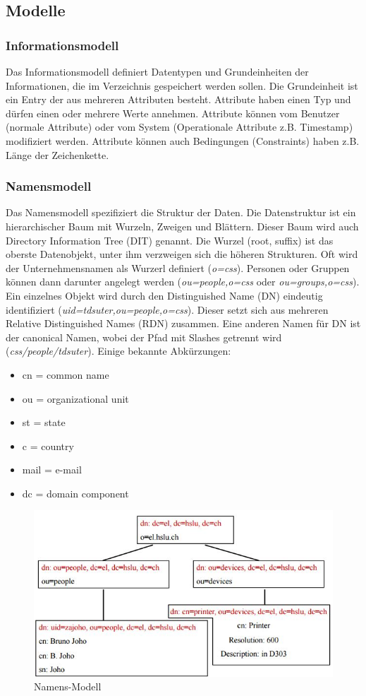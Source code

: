 \subsection{Modelle}

\subsubsection{Informationsmodell}
Das Informationsmodell definiert Datentypen und Grundeinheiten der Informationen, die im Verzeichnis gespeichert werden sollen. Die Grundeinheit ist ein Entry der aus mehreren Attributen besteht. Attribute haben einen Typ und dürfen einen oder mehrere Werte annehmen. Attribute können vom Benutzer (normale Attribute) oder vom System (Operationale Attribute z.B. Timestamp) modifiziert werden. Attribute können auch Bedingungen (Constraints) haben z.B. Länge der Zeichenkette.

\subsubsection{Namensmodell}

Das Namensmodell spezifiziert die Struktur der Daten. Die Datenstruktur ist ein hierarchischer Baum mit Wurzeln, Zweigen und Blättern. Dieser Baum wird auch Directory Information Tree (DIT) genannt. Die Wurzel (root, suffix) ist das oberste Datenobjekt, unter ihm verzweigen sich die höheren Strukturen. Oft wird der Unternehmensnamen als Wurzerl definiert (\emph{o=css}). Personen oder Gruppen können dann darunter angelegt werden (\emph{ou=people,o=css} oder \emph{ou=groups,o=css}). Ein einzelnes Objekt wird durch den Distinguished Name (DN) eindeutig identifiziert (\emph{uid=tdsuter,ou=people,o=css}). Dieser setzt sich aus mehreren Relative Distinguished Names (RDN) zusammen. Eine anderen Namen für DN ist der canonical Namen, wobei der Pfad mit Slashes getrennt wird (\emph{css/people/tdsuter}). Einige bekannte Abkürzungen:

\begin{itemize}
	\item cn = common name
	\item ou = organizational unit
	\item st = state
	\item c = country
	\item mail = e-mail
	\item dc = domain component
\end{itemize}

\begin{figure}[h!]
\centering
\includegraphics[width=0.7\linewidth]{fig/ldap-namens-modell}
\caption{Namens-Modell}
\label{fig:ldap-namens-modell}
\end{figure}

